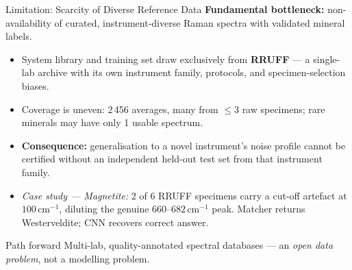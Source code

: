 \documentclass[aspectratio=169,10pt]{beamer}
\begin{document}
\begin{frame}{Limitation: Scarcity of Diverse Reference Data}
  \textbf{Fundamental bottleneck:} non-availability of curated,
  instrument-diverse Raman spectra with validated mineral labels.

  \vspace{0.12cm}
  \begin{itemize}\setlength\itemsep{0.12cm}\small
    \item System library and training set draw exclusively from
          \textbf{RRUFF} --- a single-lab archive with its own instrument
          family, protocols, and specimen-selection biases.
    \item Coverage is uneven: 2\,456 averages, many from $\le3$
          raw specimens; rare minerals may have only 1 usable spectrum.
    \item \textbf{Consequence:} generalisation to a novel instrument's
          noise profile cannot be certified without an independent
          held-out test set from that instrument family.
    \item \textit{Case study --- Magnetite:} 2 of 6 RRUFF specimens carry
          a cut-off artefact at $100\,\text{cm}^{-1}$, diluting the
          genuine $660$--$682\,\text{cm}^{-1}$ peak.
          Matcher returns Westerveldite; CNN recovers correct answer.
  \end{itemize}

  \vspace{0.15cm}
  \begin{block}{Path forward}
    Multi-lab, quality-annotated spectral databases ---
    an \emph{open data problem}, not a modelling problem.
  \end{block}
\end{frame}
\end{document}
